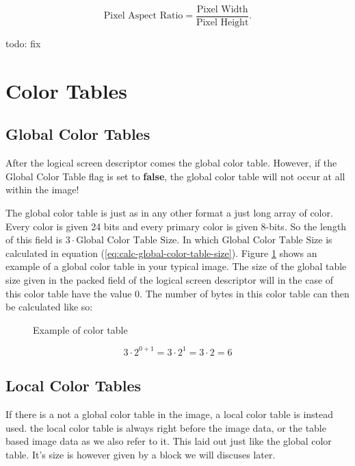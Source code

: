 \begin{refsection}
  \begin{equation*}
    \textrm{Pixel Aspect Ratio} = \frac{\text{Pixel Width}}{\text{Pixel Height}}.
  \end{equation*}

  todo: fix

  \section{Color Tables}

  \subsection{Global Color Tables}

  After the logical screen descriptor comes the global color
  table. However, if the Global Color Table flag is set to
  \textbf{false}, the global color table will not occur at all within
  the image!

  The global color table is just as in any other format a just long
  array of color. Every color is given 24 bits and every primary color
  is given 8-bits. So the length of this field is $3 \cdot
  \textrm{Global Color Table Size}$. In which $\textrm{Global Color
    Table Size}$ is calculated in equation
  (\ref{eq:calc-global-color-table-size}). Figure
  \ref{fig:gif-color-table} shows an example of a global color table
  in your typical \gif image. The size of the global table size given
  in the packed field of the logical screen descriptor will in the
  case of this color table have the value $0$. The number of bytes in
  this color table can then be calculated like so:

  \begin{figure}
    \centering
    \caption{Example of \gif color table }
    \label{fig:gif-color-table}
  \end{figure}

  \begin{equation*}
    3 \cdot 2^{0 +1} = 3 \cdot 2^1 = 3 \cdot 2 = 6
  \end{equation*}

  \subsection{Local Color Tables}

  If there is a not a global color table in the \gif image, a local
  color table is instead used. the local color table is always right
  before the image data, or the table based image data as we also
  refer to it. This laid out just like the global color table. It's
  size is however given by a block we will discuses later.


\end{refsection}
